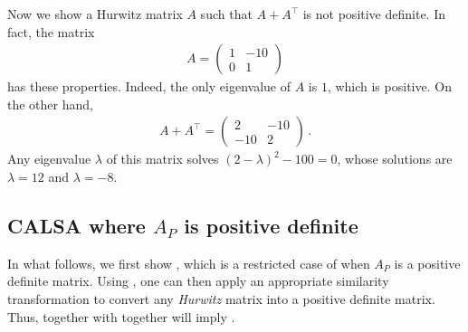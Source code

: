 Now we show a Hurwitz matrix $A$ such that $A+A^\top$ is not positive definite.
In fact, the matrix 
\begin{align*}
A = 
\begin{pmatrix}
1 & -10 \\
0 & 1
\end{pmatrix}
\end{align*}
has these properties. Indeed, the only eigenvalue of $A$ is $1$, which is positive.
On the other hand,
\begin{align*}
A + A^\top = 
\begin{pmatrix}
2 & -10 \\
-10 & 2
\end{pmatrix}\,.
\end{align*}
Any eigenvalue $\lambda$ of this matrix solves $(2-\lambda)^2 - 100=0$, whose solutions 
are $\lambda = 12$ and $\lambda = -8$.

\subsection{CALSA where $A_P$ is positive definite}
In what follows, we first show , which is a restricted case of  when $A_P$ is a positive definite matrix. Using , one can then apply an appropriate similarity transformation to convert any \emph{Hurwitz} matrix into a positive definite matrix. Thus,  together with  together will imply .


